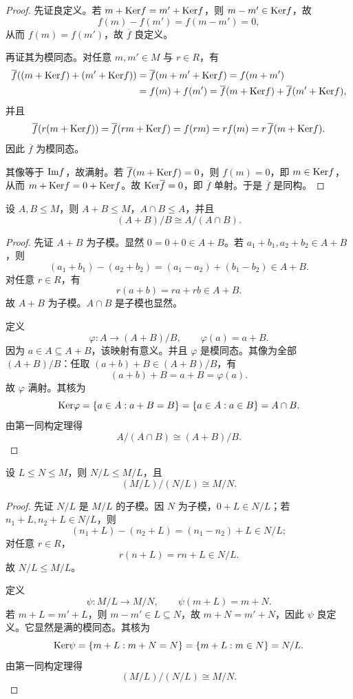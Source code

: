 \begin{proof}
先证良定义。若 $m+\mathrm{Ker} f=m'+\mathrm{Ker} f$，则 $m-m'\in \mathrm{Ker} f$，故
\[
f(m)-f(m')=f(m-m')=0,
\]
从而 $f(m)=f(m')$，故 $\overline f$ 良定义。

再证其为模同态。对任意 $m,m'\in M$ 与 $r\in R$，有
\begin{align*}
\overline f((m+\mathrm{Ker} f)+(m'+\mathrm{Ker} f))
&=\overline f(m+m'+\mathrm{Ker} f)=f(m+m')\\
&=f(m)+f(m')=\overline f(m+\mathrm{Ker} f)+\overline f(m'+\mathrm{Ker} f),
\end{align*}
并且
\[
\overline f(r(m+\mathrm{Ker} f))=\overline f(rm+\mathrm{Ker} f)=f(rm)=rf(m)=r\,\overline f(m+\mathrm{Ker} f).
\]
因此 $\overline f$ 为模同态。

其像等于 $\mathrm{Im} f$，故满射。若 $\overline f(m+\mathrm{Ker} f)=0$，则 $f(m)=0$，即 $m\in \mathrm{Ker} f$，从而 $m+\mathrm{Ker} f=0+\mathrm{Ker} f$。故 $\mathrm{Ker} \overline f=0$，即 $\overline f$ 单射。于是 $\overline f$ 是同构。
\end{proof}

\begin{theorem}[第二同构定理]
设 $A,B\le M$，则 $A+B\le M$，$A\cap B\le A$，并且
\[
(A+B)/B\cong A/(A\cap B).
\]
\end{theorem}

\begin{proof}
先证 $A+B$ 为子模。显然 $0=0+0\in A+B$。若 $a_1+b_1,a_2+b_2\in A+B$，则
\[
(a_1+b_1)-(a_2+b_2)=(a_1-a_2)+(b_1-b_2)\in A+B.
\]
对任意 $r\in R$，有
\[
r(a+b)=ra+rb\in A+B.
\]
故 $A+B$ 为子模。$A\cap B$ 是子模也显然。

定义
\[
\varphi\colon A\to (A+B)/B,\qquad \varphi(a)=a+B.
\]
因为 $a\in A\subseteq A+B$，该映射有意义。并且 $\varphi$ 是模同态。其像为全部 $(A+B)/B$：任取 $(a+b)+B\in (A+B)/B$，有
\[
(a+b)+B=a+B=\varphi(a).
\]
故 $\varphi$ 满射。其核为
\[
\mathrm{Ker}\varphi=\{a\in A:a+B=B\}=\{a\in A:a\in B\}=A\cap B.
\]
由第一同构定理得
\[
A/(A\cap B)\cong (A+B)/B.
\]
\end{proof}

\begin{theorem}[第三同构定理]
设 $L\le N\le M$，则 $N/L\le M/L$，且
\[
(M/L)/(N/L)\cong M/N.
\]
\end{theorem}

\begin{proof}
先证 $N/L$ 是 $M/L$ 的子模。因 $N$ 为子模，$0+L\in N/L$；若 $n_1+L,n_2+L\in N/L$，则
\[
(n_1+L)-(n_2+L)=(n_1-n_2)+L\in N/L;
\]
对任意 $r\in R$，
\[
r(n+L)=rn+L\in N/L.
\]
故 $N/L\le M/L$。

定义
\[
\psi\colon M/L\to M/N,\qquad \psi(m+L)=m+N.
\]
若 $m+L=m'+L$，则 $m-m'\in L\subseteq N$，故 $m+N=m'+N$，因此 $\psi$ 良定义。它显然是满的模同态。其核为
\[
\mathrm{Ker}\psi=\{m+L:m+N=N\}=\{m+L:m\in N\}=N/L.
\]
由第一同构定理得
\[
(M/L)/(N/L)\cong M/N.
\]
\end{proof}

